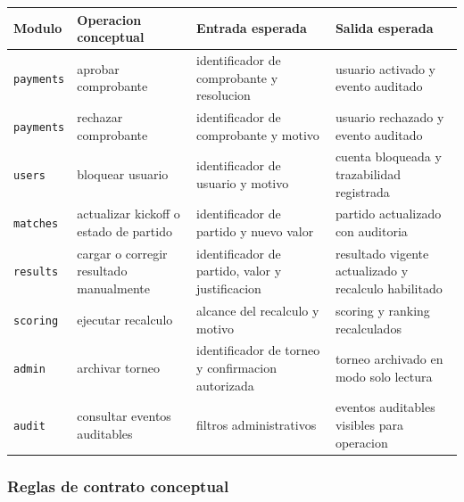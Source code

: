 \begin{longtable}{p{}p{}p{}p{}}
\toprule
\textbf{Modulo} & \textbf{Operacion conceptual} & \textbf{Entrada esperada} & \textbf{Salida esperada} \\
\midrule
\texttt{payments} & aprobar comprobante & identificador de comprobante y resolucion & usuario activado y evento auditado \\
\texttt{payments} & rechazar comprobante & identificador de comprobante y motivo & usuario rechazado y evento auditado \\
\texttt{users} & bloquear usuario & identificador de usuario y motivo & cuenta bloqueada y trazabilidad registrada \\
\texttt{matches} & actualizar kickoff o estado de partido & identificador de partido y nuevo valor & partido actualizado con auditoria \\
\texttt{results} & cargar o corregir resultado manualmente & identificador de partido, valor y justificacion & resultado vigente actualizado y recalculo habilitado \\
\texttt{scoring} & ejecutar recalculo & alcance del recalculo y motivo & scoring y ranking recalculados \\
\texttt{admin} & archivar torneo & identificador de torneo y confirmacion autorizada & torneo archivado en modo solo lectura \\
\texttt{audit} & consultar eventos auditables & filtros administrativos & eventos auditables visibles para operacion \\
\bottomrule
\end{longtable}

\subsubsection{Reglas de contrato conceptual}

